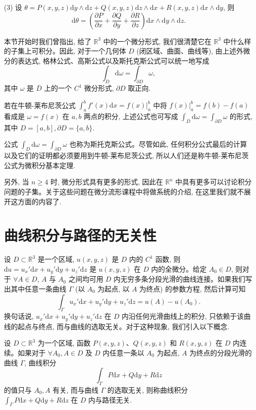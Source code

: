 (3) 设 $\theta=P(x,y,z)\mathrm dy\wedge\mathrm dz+Q(x,y,z)\mathrm dz\wedge\mathrm dx+R(x,y,z)\mathrm dx\wedge\mathrm dy$, 则
\[
  \mathrm d\theta=
  \left(\frac{\partial P}{\partial x}+\frac{\partial Q}{\partial y}+\frac{\partial R}{\partial z}\right)
  \mathrm dx\wedge\mathrm dy\wedge\mathrm dz.
\]

本节开始时我们曾指出, 给了 $\mathbb R^3$ 中的一个微分形式, 我们很清楚它在 $\mathbb R^3$ 中什么样的子集上可积分。因此, 对于一个几何体 $D$ (闭区域、曲面、曲线等), 由上述外微分的表达式, 格林公式、高斯公式以及斯托克斯公式可以统一地写成
\[
  \int_D\mathrm d\omega=\int_{\partial D}\omega,
\]
其中 $\omega$ 是 $\overline D$ 上的一个 $C^1$ 微分形式, $\partial D$ 取正向.

若在牛顿-莱布尼茨公式 $\int_a^b f'(x)\mathrm dx=f(x)\big|_a^b$ 中将 $f(x)\big|_a^b=f(b)-f(a)$ 看成是 $\omega=f(x)$ 在 $a,b$ 两点的积分, 上述公式也可写成 $\int_D\mathrm d\omega=\int_{\partial D}\omega$ 的形式, 其中 $D=[a,b],\partial D=\{a,b\}$.

公式 $\int_D\mathrm d\omega=\int_{\partial D}\omega$ 也称为斯托克斯公式。尽管如此, 任何积分公式最后的计算以及它们的证明都必须要用到牛顿-莱布尼茨公式, 所以人们还是称牛顿-莱布尼茨公式为微积分基本定理.

另外, 当 $n\geqslant4$ 时, 微分形式具有更多的形式, 因此在 $\mathbb R^n$ 中具有更多可以讨论积分问题的子集。关于这些问题在微分流形课程中将做系统的介绍, 在这里我们就不展开这方面的内容了.

\section{曲线积分与路径的无关性}
\label{sec:ma-16-7}

设 $D\subset\mathbb R^3$ 是一个区域, $u(x,y,z)$ 是 $D$ 内的 $C^1$ 函数, 则 $\mathrm du=u_x'\mathrm dx+u_y'\mathrm dy+u_z'\mathrm dz$ 是 $u(x,y,z)$ 在 $D$ 内的全微分。给定 $A_0\in D$, 则对于 $\forall A\in D$, $A$ 与 $A_0$ 之间均可用 $D$ 内无穷多条分段光滑的曲线连接。如果我们写出其中任意一条曲线 $\Gamma$ (以 $A_0$ 为起点, 以 $A$ 为终点) 的参数方程, 然后计算可知
\[
  \int_\Gamma u_x'\mathrm dx+u_y'\mathrm dy+u_z'\mathrm dz=u(A)-u(A_0).
\]
换句话说, $u_x'\mathrm dx+u_y'\mathrm dy+u_z'\mathrm dz$ 在 $D$ 内沿任何光滑曲线上的积分, 只依赖于该曲线的起点与终点, 而与曲线的选取无关。对于这种现象, 我们引入以下概念.

\begin{definition}\label{definition:ma-16-7-1}
设 $D\subset\mathbb R^3$ 为一个区域, 函数 $P(x,y,z)$、$Q(x,y,z)$ 和 $R(x,y,z)$ 在 $D$ 内连续。如果对于 $\forall A_0,A\in D$ 及 $D$ 内任意一条以 $A_0$ 为起点, $A$ 为终点的分段光滑的曲线 $\Gamma$, 曲线积分
\[
  \int_\Gamma P\mathrm dx+Q\mathrm dy+R\mathrm dz
\]
的值只与 $A_0,A$ 有关, 而与曲线 $\Gamma$ 的选取无关, 则称曲线积分 $\int_\Gamma P\mathrm dx+Q\mathrm dy+R\mathrm dz$ 在 $D$ 内与路径无关.
\end{definition}


